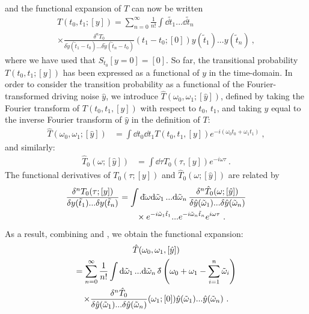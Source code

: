 \documentclass[%
 reprint,
superscriptaddress,
nofootinbib,
 amsmath,amssymb,
 aps,
prx,
]{revtex4-2}
\begin{document}
and the functional expansion of $T$ can now be written
\begin{multline}
\label{eq:intermediate_step_functional_expansion}
  T(t_0,t_1;[y]) =\sum_{n=0}^{\infty}\frac{1}{n!} \int  \dd{\tilde{t}_1}...\dd{\tilde{t}_n}\\
  \times  \frac{\delta^n T_0 }{\delta \tilde{y}(\tilde{t}_1-t_0)...\delta \tilde{y}(\tilde{t}_n-t_0)}(t_1-t_0;[0])y(\tilde{t}_1)...y(\tilde{t}_n)~,
\end{multline}
where we have used that $S_{t_0}[y=0]= [0]$.
So far, the transitional probability $T(t_0,t_1;[y])$ has been expressed as a functional of $y$ in the time-domain. In order to consider the transition probability as a functional of the Fourier-transformed driving noise $\hat{y}$, we introduce $\hat{T}(\omega_0,\omega_1;[\hat{y}])$, defined by taking the Fourier transform of $T(t_0, t_1, [y])$ with respect to $t_0$, $t_1$, and taking $y$ equal to the inverse Fourier transform of $\hat{y}$ in the definition of $T$:
\begin{align}
\label{eq:def_hatT}
\hat{T}(\omega_0,\omega_1;[\hat{y}])&=\int \dd{t_0}   \dd{t_1} T(t_0 ,t_1, [y]) e^{-i (\omega_0 t_0+\omega_1 t_1)}~,
 \end{align}
 and similarly:
 \begin{align}
\hat{T}_0(\omega ;[\hat{y}])&=\int \dd{\tau} T_0(\tau, [y]) e^{-i \omega \tau}~.
 \end{align}
The functional derivatives of $T_0(\tau;[y])$ and $\hat{T}_0(\omega;[\hat{y}])$ are related by
\begin{align}
 \frac{\delta^n T_0(\tau;[y])}{\delta y(\tilde{t}_1)...\delta y(\tilde{t}_n)} &=\int \mathrm{d}\hspace*{-0.08em}\bar{}\hspace*{0.1em}{\omega}\mathrm{d}{\tilde{\omega}_1}\,...\mathrm{d}{\tilde{\omega}_n}\, \frac{\delta ^n \hat{T}_0(\omega;[\hat{y}])}{\delta \hat{y}(\tilde{\omega}_1)...\delta \hat{y}(\tilde{\omega}_n)}\nonumber\\
& \qquad \times e^{-i \tilde{\omega}_1 \tilde{t}_1}...e^{-i\tilde{\omega}_n \tilde{t}_n} e^{i \omega \tau}~.
\end{align}
As a result, combining   and , we obtain the functional expansion:
    \begin{multline}
    \hat{T}(\omega_0,\omega_1,[\hat{y}])
    \\
    = \sum_{n=0}^{\infty}\frac{1}{n!} \int \mathrm{d}{\tilde{\omega}_1}\,...\mathrm{d}{\tilde{\omega}_n}\,\delta\hspace*{-0.24em}\bar{}\hspace*{0.1em}\,\left(\omega_0 + \omega_1 - \sum_{i=1}^n \tilde{\omega}_i\right) \\ \times \frac{\delta^n \hat{T}_0 }{\delta \hat{y}(\tilde{\omega}_1)...\delta \hat{y}(\tilde{\omega}_n)} (\omega_1;[0]) \hat{y}(\tilde{\omega}_1)... \hat{y}(\tilde{\omega}_n) 
    	\label{eq:rho_functional_expansion}~.
\end{multline}
\end{document}
